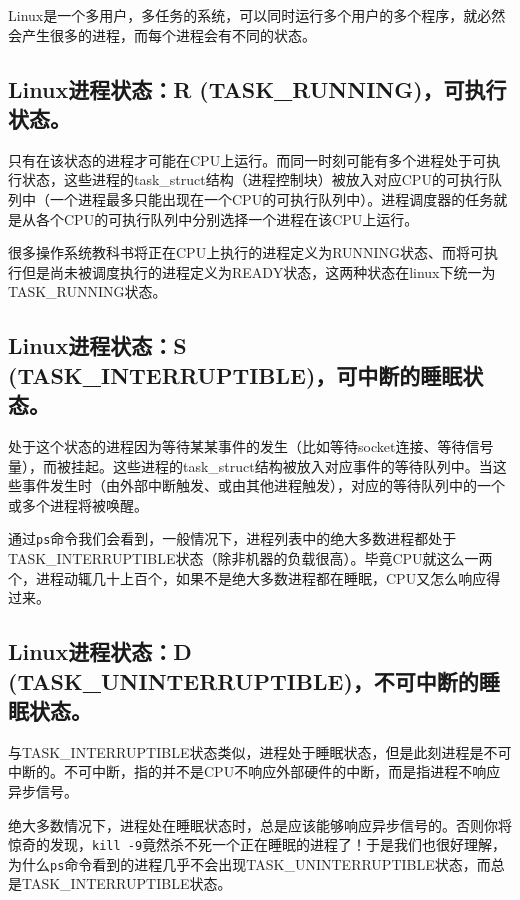\documentclass[doctor,openright,twoside]{sjtuthesis}
\newcommand{\passthrough}[1]{#1}
\theoremstyle{plain}
\theoremstyle{definition}
\theoremstyle{remark}
\theoremstyle{ocrenumbox}
\theoremstyle{plain}
\begin{document}
Linux是一个多用户，多任务的系统，可以同时运行多个用户的多个程序，就必然会产生很多的进程，而每个进程会有不同的状态。

\hypertarget{linuxr-task_running}{%
\subsection{Linux进程状态：R (TASK\_RUNNING)，可执行状态。}\label{linuxr-task_running}}

只有在该状态的进程才可能在CPU上运行。而同一时刻可能有多个进程处于可执行状态，这些进程的task\_struct结构（进程控制块）被放入对应CPU的可执行队列中（一个进程最多只能出现在一个CPU的可执行队列中）。进程调度器的任务就是从各个CPU的可执行队列中分别选择一个进程在该CPU上运行。

很多操作系统教科书将正在CPU上执行的进程定义为RUNNING状态、而将可执行但是尚未被调度执行的进程定义为READY状态，这两种状态在linux下统一为 TASK\_RUNNING状态。

\hypertarget{linuxs-task_interruptible}{%
\subsection{Linux进程状态：S (TASK\_INTERRUPTIBLE)，可中断的睡眠状态。}\label{linuxs-task_interruptible}}

处于这个状态的进程因为等待某某事件的发生（比如等待socket连接、等待信号量），而被挂起。这些进程的task\_struct结构被放入对应事件的等待队列中。当这些事件发生时（由外部中断触发、或由其他进程触发），对应的等待队列中的一个或多个进程将被唤醒。

通过\passthrough{\lstinline!ps!}命令我们会看到，一般情况下，进程列表中的绝大多数进程都处于TASK\_INTERRUPTIBLE状态（除非机器的负载很高）。毕竟CPU就这么一两个，进程动辄几十上百个，如果不是绝大多数进程都在睡眠，CPU又怎么响应得过来。

\hypertarget{linuxd-task_uninterruptible}{%
\subsection{Linux进程状态：D (TASK\_UNINTERRUPTIBLE)，不可中断的睡眠状态。}\label{linuxd-task_uninterruptible}}

与TASK\_INTERRUPTIBLE状态类似，进程处于睡眠状态，但是此刻进程是不可中断的。不可中断，指的并不是CPU不响应外部硬件的中断，而是指进程不响应异步信号。

绝大多数情况下，进程处在睡眠状态时，总是应该能够响应异步信号的。否则你将惊奇的发现，\passthrough{\lstinline!kill -9!}竟然杀不死一个正在睡眠的进程了！于是我们也很好理解，为什么\passthrough{\lstinline!ps!}命令看到的进程几乎不会出现TASK\_UNINTERRUPTIBLE状态，而总是TASK\_INTERRUPTIBLE状态。
\end{document}
